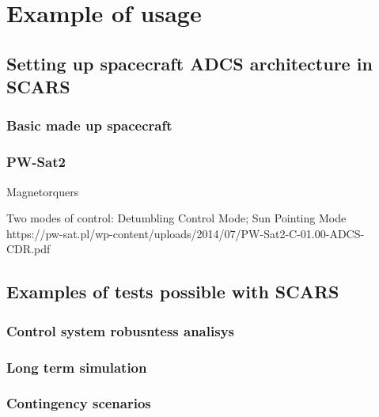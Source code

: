 \section{Example of usage}\label{sec:examples}

\subsection{Setting up spacecraft ADCS architecture in SCARS}

\subsubsection{Basic made up spacecraft}

\subsubsection{PW-Sat2}
    Magnetorquers

    Two modes of control: Detumbling Control Mode; Sun Pointing Mode
    https://pw-sat.pl/wp-content/uploads/2014/07/PW-Sat2-C-01.00-ADCS-CDR.pdf

\subsection{Examples of tests possible with SCARS}

\subsubsection{Control system robusntess analisys}

\subsubsection{Long term simulation}

\subsubsection{Contingency scenarios}
